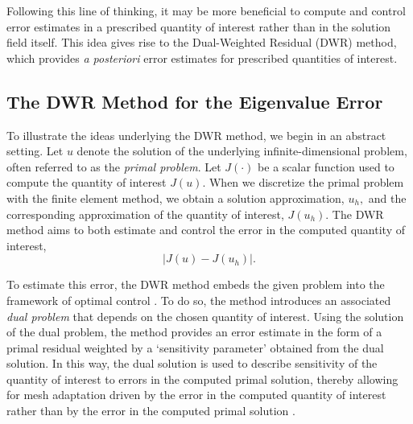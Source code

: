 Following this line of thinking, it may be more beneficial to compute and control error estimates in a prescribed quantity of interest rather than in the solution field itself. This idea gives rise to the Dual-Weighted Residual (DWR) method, which provides \textit{a posteriori} error estimates for prescribed quantities of interest.






\subsection{The DWR Method for the Eigenvalue Error}


To illustrate the ideas underlying the DWR method, we begin in an abstract setting. 
Let $u$ denote the solution of the underlying infinite-dimensional problem, often referred to as the \textit{primal problem}. Let $J(\cdot)$ be a scalar function used to compute the quantity of interest $J(u).$ When we discretize the primal problem with the finite element method, we obtain a solution approximation, $u_h,$ and the corresponding approximation of the quantity of interest, $J(u_h).$ The DWR method aims to both estimate and control the error in the computed quantity of interest,
\begin{equation}
    |J(u) - J(u_h)|.
\end{equation}

 
To estimate this error, the DWR method embeds the given problem into the framework of optimal control \cite{Becker}. To do so, the method introduces an associated \textit{dual problem} that depends on the chosen quantity of interest. Using the solution of the dual problem, the method provides an error estimate in the form of a primal residual weighted by a `sensitivity parameter' obtained from the dual solution. In this way, the dual solution is used to describe sensitivity of the quantity of interest to errors in the computed primal solution, thereby allowing for mesh adaptation driven by the error in the computed quantity of interest rather than by the error in the computed primal solution \cite{Becker}.

